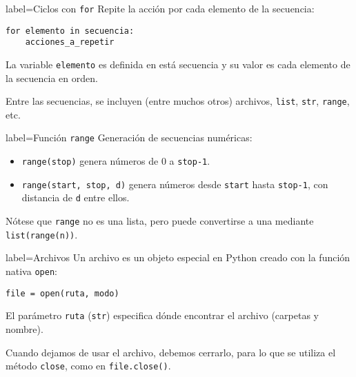 
\begin{contentbox}{label=Ciclos con \texttt{for}}
    Repite la acción por cada elemento de la secuencia:
\begin{lstlisting}
for elemento in secuencia:
    acciones_a_repetir
\end{lstlisting}
    
    La variable \lstinline!elemento! es definida en está secuencia y su valor es cada elemento de la secuencia en orden.
    
    Entre las secuencias, se incluyen (entre muchos otros) archivos, \lstinline!list!, \lstinline!str!, \lstinline!range!, etc.
\end{contentbox}

\begin{contentbox}{label=Función \lstinline!range!}
    Generación de secuencias numéricas:
    \begin{itemize}
        \item \lstinline!range(stop)! genera números de 0 a \texttt{stop-1}.
        \item \lstinline!range(start, stop, d)! genera números desde \texttt{start} hasta \texttt{stop-1}, con distancia de \texttt{d} entre ellos.
    \end{itemize}
    

    Nótese que \lstinline!range! no es una lista, pero puede convertirse a una mediante \lstinline!list(range(n))!.
\end{contentbox}

\begin{contentbox}{label=Archivos}
    Un archivo es un objeto especial en Python creado con la función nativa \lstinline!open!:
    
    \begin{center}
        \lstinline!file = open(ruta, modo)!
    \end{center}
    
    El parámetro \texttt{ruta} (\lstinline!str!) especifica dónde encontrar el archivo (carpetas y nombre).
    
    Cuando dejamos de usar el archivo, debemos cerrarlo, para lo que se utiliza el método \lstinline!close!, como en \lstinline!file.close()!.
\end{contentbox}
    
